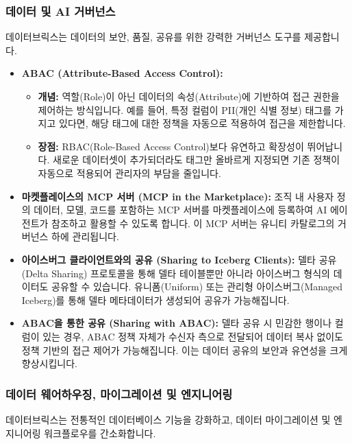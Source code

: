 \documentclass[11pt,a4paper]{article}
\theoremstyle{definition}
\begin{document}
\subsubsection{데이터 및 AI 거버넌스}
데이터브릭스는 데이터의 보안, 품질, 공유를 위한 강력한 거버넌스 도구를 제공합니다.

\begin{itemize}
    \item \textbf{ABAC (Attribute-Based Access Control):}
    \begin{itemize}
        \item \textbf{개념:} 역할(Role)이 아닌 데이터의 속성(Attribute)에 기반하여 접근 권한을 제어하는 방식입니다. 예를 들어, 특정 컬럼이 PII(개인 식별 정보) 태그를 가지고 있다면, 해당 태그에 대한 정책을 자동으로 적용하여 접근을 제한합니다.
        \item \textbf{장점:} RBAC(Role-Based Access Control)보다 유연하고 확장성이 뛰어납니다. 새로운 데이터셋이 추가되더라도 태그만 올바르게 지정되면 기존 정책이 자동으로 적용되어 관리자의 부담을 줄입니다.
    \end{itemize}
    \item \textbf{마켓플레이스의 MCP 서버 (MCP in the Marketplace):} 조직 내 사용자 정의 데이터, 모델, 코드를 포함하는 MCP 서버를 마켓플레이스에 등록하여 AI 에이전트가 참조하고 활용할 수 있도록 합니다. 이 MCP 서버는 유니티 카탈로그의 거버넌스 하에 관리됩니다.
    \item \textbf{아이스버그 클라이언트와의 공유 (Sharing to Iceberg Clients):} 델타 공유(Delta Sharing) 프로토콜을 통해 델타 테이블뿐만 아니라 아이스버그 형식의 데이터도 공유할 수 있습니다. 유니폼(Uniform) 또는 관리형 아이스버그(Managed Iceberg)를 통해 델타 메타데이터가 생성되어 공유가 가능해집니다.
    \item \textbf{ABAC을 통한 공유 (Sharing with ABAC):} 델타 공유 시 민감한 행이나 컬럼이 있는 경우, ABAC 정책 자체가 수신자 측으로 전달되어 데이터 복사 없이도 정책 기반의 접근 제어가 가능해집니다. 이는 데이터 공유의 보안과 유연성을 크게 향상시킵니다.
\end{itemize}

\subsubsection{데이터 웨어하우징, 마이그레이션 및 엔지니어링}
데이터브릭스는 전통적인 데이터베이스 기능을 강화하고, 데이터 마이그레이션 및 엔지니어링 워크플로우를 간소화합니다.
\end{document}
